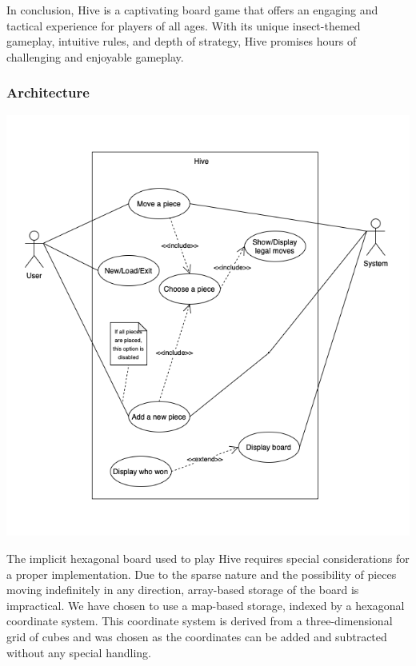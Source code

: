\documentclass[
]{article}
\begin{document}
In conclusion, Hive is a captivating board game that offers an engaging
and tactical experience for players of all ages. With its unique
insect-themed gameplay, intuitive rules, and depth of strategy, Hive
promises hours of challenging and enjoyable gameplay.

\pagebreak

\hypertarget{architecture}{%
\subsubsection{Architecture}\label{architecture}}

\includegraphics[width=1\textwidth,height=\textheight]{images/hiveusecase.drawio.png}

The implicit hexagonal board used to play Hive requires special
considerations for a proper implementation. Due to the sparse nature and
the possibility of pieces moving indefinitely in any direction,
array-based storage of the board is impractical. We have chosen to use a
map-based storage, indexed by a hexagonal coordinate system. This
coordinate system is derived from a three-dimensional grid of cubes and
was chosen as the coordinates can be added and subtracted without any
special handling.
\end{document}
